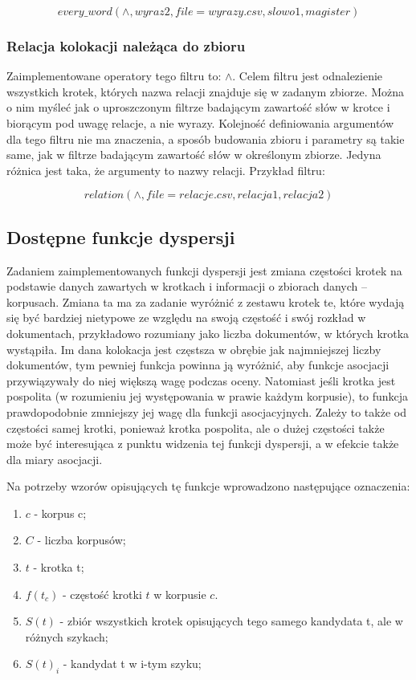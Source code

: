 $$ every\_word(\wedge,wyraz2,file=wyrazy.csv,slowo1,magister) $$

\subsubsection{Relacja kolokacji należąca do zbioru}
Zaimplementowane operatory tego filtru to: $ \wedge $.
Celem filtru jest odnalezienie wszystkich krotek, których nazwa relacji znajduje się w zadanym zbiorze.
Można o nim myśleć jak o uproszczonym filtrze badającym zawartość słów w krotce i biorącym pod uwagę relacje, a nie wyrazy.
Kolejność definiowania argumentów dla tego filtru nie ma znaczenia, a sposób budowania zbioru i parametry są takie same, jak w filtrze badającym zawartość słów w określonym zbiorze.
Jedyna różnica jest taka, że argumenty to nazwy relacji.
Przykład filtru:

$$ relation(\wedge,file=relacje.csv,relacja1,relacja2) $$


\subsection{Dostępne funkcje dyspersji}
Zadaniem zaimplementowanych funkcji dyspersji jest zmiana częstości krotek na podstawie danych zawartych w krotkach i informacji o zbiorach danych -- korpusach.
Zmiana ta ma za zadanie wyróżnić z zestawu krotek te, które wydają się być bardziej nietypowe ze względu na swoją częstość i swój rozkład w dokumentach, przykładowo rozumiany jako liczba dokumentów, w których krotka wystąpiła.
Im dana kolokacja jest częstsza w obrębie jak najmniejszej liczby dokumentów, tym pewniej funkcja powinna ją wyróżnić, aby funkcje asocjacji przywiązywały do niej większą wagę podczas oceny.
Natomiast jeśli krotka jest pospolita (w rozumieniu jej występowania w prawie każdym korpusie), to funkcja prawdopodobnie zmniejszy jej wagę dla funkcji asocjacyjnych.
Zależy to także od częstości samej krotki, ponieważ krotka pospolita, ale o dużej częstości także może być interesująca z punktu widzenia tej funkcji dyspersji, a w efekcie także dla miary asocjacji.
\par
Na potrzeby wzorów opisujących tę funkcje wprowadzono następujące oznaczenia:
\begin{enumerate}
 \item $ c $ - korpus c;
 \item $ C $ - liczba korpusów;
 \item $ t $ - krotka t;
 \item $ f(t_{c}) $ - częstość krotki $ t $ w korpusie $ c $.
 \item $ S(t) $ - zbiór wszystkich krotek opisujących tego samego kandydata t, ale w różnych szykach;
 \item $ S(t)_{i} $ - kandydat t w i-tym szyku;
\end{enumerate}


